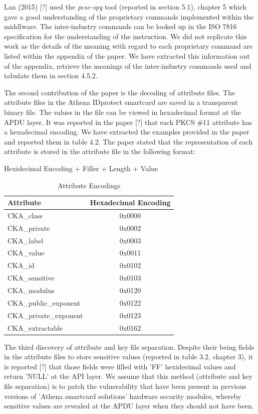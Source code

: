 \documentclass[bsc,frontabs,twoside,singlespacing,parskip,deptreport]{infthesis}     %
\begin{document}
Lan (2015) [?] used the \textit{pcsc-spy} tool (reported in section 5.1), chapter 5 which gave a good understanding of the proprietary commands implemented within the middlware. The inter-industry commands can be looked up in the ISO 7816 specification for the understanding of the instruction. We did not replicate this work as the details of the meaning with regard to each proprietary command are listed within the appendix of the paper. We have extracted this information out of the appendix, retrieve the meanings of the inter-industry commands used and tabulate them in section 4.5.2.

The second contribution of the paper is the decoding of attribute files. The attribute files in the Athena IDprotect smartcard are saved in a transparent binary file. The values in the file can be viewed in hexadecimal format at the APDU layer. It was reported in the paper [?] that each PKCS \#11 attribute has a hexadecimal encoding. We have extracted the examples provided in the paper and reported them in table 4.2. The paper stated that the representation of each attribute is stored in the attribute file in the following format:

\begin{center}
Hexidecimal Encoding + Filler + Length + Value
\end{center}

\begin{table}[H]
\begin{tabular}{|l|c|}
\hline
Attribute & Hexadecimal Encoding\\
\hline
CKA\_class & 0x0000\\
\hline
CKA\_private & 0x0002\\
\hline
CKA\_label & 0x0003\\
\hline
CKA\_value & 0x0011\\
\hline
CKA\_id & 0x0102\\
\hline
CKA\_sensitive & 0x0103\\
\hline
CKA\_modulus & 0x0120\\
\hline
CKA\_public\_exponent & 0x0122\\
\hline
CKA\_private\_exponent & 0x0123\\
\hline
CKA\_extractable & 0x0162\\
\hline
\end{tabular}
\caption{Attribute Encodings}
\end{table}

The third discovery of attribute and key file separation. Despite their being fields in the attribute files to store sensitive values (reported in table 3.2, chapter 3), it is reported [?] that those fields were filled with 'FF' hexidecimal values and return 'NULL' at the API layer. We assume that this method (attribute and key file separation) is to patch the vulnerability that have been present in previous versions of 'Athena smartcard solutions' hardware security modules, whereby sensitive values are revealed at the APDU layer when they should not have been.
\end{document}

